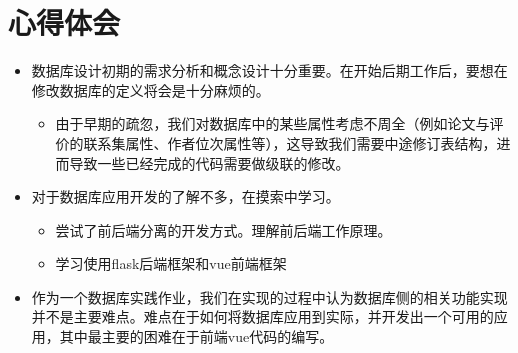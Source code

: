 \chapter{心得体会}
\begin{itemize}
    \item 数据库设计初期的需求分析和概念设计十分重要。在开始后期工作后，要想在修改数据库的定义将会是十分麻烦的。
    \begin{itemize}
        \item 由于早期的疏忽，我们对数据库中的某些属性考虑不周全（例如论文与评价的联系集属性、作者位次属性等），这导致我们需要中途修订表结构，进而导致一些已经完成的代码需要做级联的修改。
    \end{itemize}
    \item 对于数据库应用开发的了解不多，在摸索中学习。
    \begin{itemize}
        \item 尝试了前后端分离的开发方式。理解前后端工作原理。
        \item 学习使用flask后端框架和vue前端框架
    \end{itemize}
    \item 作为一个数据库实践作业，我们在实现的过程中认为数据库侧的相关功能实现并不是主要难点。难点在于如何将数据库应用到实际，并开发出一个可用的应用，其中最主要的困难在于前端vue代码的编写。
\end{itemize}
